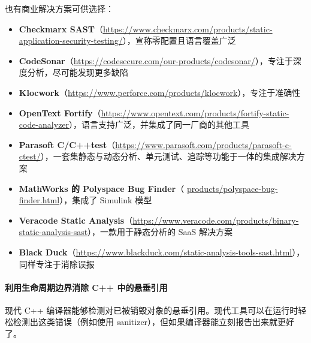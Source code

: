 \label{idx:1081}
也有商业解决方案可供选择：

\begin{itemize}
\label{idx:1082}
\item \textbf{Checkmarx SAST}（\href{https://www.checkmarx.com/products/static-application-security-testing/}{https://www.checkmarx.com/products/static-application-security-testing/}），宣称零配置且语言覆盖广泛
\label{idx:1083}
\item \textbf{CodeSonar}（\href{https://codesecure.com/our-products/codesonar/}{https://codesecure.com/our-products/codesonar/}），专注于深度分析，尽可能发现更多缺陷
\label{idx:1084}
\item \textbf{Klocwork}（\href{https://www.perforce.com/products/klocwork}{https://www.perforce.com/products/klocwork}），专注于准确性
\label{idx:1085}
\item \textbf{OpenText Fortify}（\href{https://www.opentext.com/products/fortify-static-code-analyzer}{https://www.opentext.com/products/fortify-static-code-analyzer}），语言支持广泛，并集成了同一厂商的其他工具
\label{idx:1086}
\item \textbf{Parasoft C/C++test}（\href{https://www.parasoft.com/products/parasoft-c-ctest/}{https://www.parasoft.com/products/parasoft-c-ctest/}），一套集静态与动态分析、单元测试、追踪等功能于一体的集成解决方案
\label{idx:1087}
\item \textbf{MathWorks 的 Polyspace Bug Finder}（ \href{http://products/polyspace-bug-finder.html}{products/polyspace-bug-finder.html}），集成了 Simulink 模型
\label{idx:1088}
\item \textbf{Veracode Static Analysis}（\href{https://www.veracode.com/products/binary-static-analysis-sast}{https://www.veracode.com/products/binary-static-analysis-sast}），一款用于静态分析的 SaaS 解决方案
\label{idx:1089}
\item \textbf{Black Duck}（\href{https://www.blackduck.com/static-analysis-tools-sast.html}{https://www.blackduck.com/static-analysis-tools-sast.html}），同样专注于消除误报
\end{itemize}

\paragraph{利用生命周期边界消除 C++ 中的悬垂引用}

\label{idx:1090}
现代 C++ 编译器能够检测对已被销毁对象的悬垂引用。现代工具可以在运行时轻松检测出这类错误（例如使用 sanitizer），但如果编译器能立刻报告出来就更好了。


